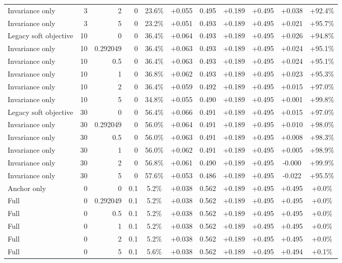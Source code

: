 \begin{table}[htbp]
\begin{tabular}{lrrrccccccc}
Invariance only & 3 & 2 & 0 & 23.6\% & +0.055 & 0.495 & +0.189 & +0.495 & +0.038 & +92.4\% \\
Invariance only & 3 & 5 & 0 & 23.2\% & +0.051 & 0.493 & +0.189 & +0.495 & +0.021 & +95.7\% \\
Legacy soft objective & 10 & 0 & 0 & 36.4\% & +0.064 & 0.493 & +0.189 & +0.495 & +0.026 & +94.8\% \\
Invariance only & 10 & 0.292049 & 0 & 36.4\% & +0.063 & 0.493 & +0.189 & +0.495 & +0.024 & +95.1\% \\
Invariance only & 10 & 0.5 & 0 & 36.4\% & +0.063 & 0.493 & +0.189 & +0.495 & +0.024 & +95.1\% \\
Invariance only & 10 & 1 & 0 & 36.8\% & +0.062 & 0.493 & +0.189 & +0.495 & +0.023 & +95.3\% \\
Invariance only & 10 & 2 & 0 & 36.4\% & +0.059 & 0.492 & +0.189 & +0.495 & +0.015 & +97.0\% \\
Invariance only & 10 & 5 & 0 & 34.8\% & +0.055 & 0.490 & +0.189 & +0.495 & +0.001 & +99.8\% \\
Legacy soft objective & 30 & 0 & 0 & 56.4\% & +0.066 & 0.491 & +0.189 & +0.495 & +0.015 & +97.0\% \\
Invariance only & 30 & 0.292049 & 0 & 56.0\% & +0.064 & 0.491 & +0.189 & +0.495 & +0.010 & +98.0\% \\
Invariance only & 30 & 0.5 & 0 & 56.0\% & +0.063 & 0.491 & +0.189 & +0.495 & +0.008 & +98.3\% \\
Invariance only & 30 & 1 & 0 & 56.0\% & +0.062 & 0.491 & +0.189 & +0.495 & +0.005 & +98.9\% \\
Invariance only & 30 & 2 & 0 & 56.8\% & +0.061 & 0.490 & +0.189 & +0.495 & -0.000 & +99.9\% \\
Invariance only & 30 & 5 & 0 & 57.6\% & +0.053 & 0.486 & +0.189 & +0.495 & -0.022 & +95.5\% \\
Anchor only & 0 & 0 & 0.1 & 5.2\% & +0.038 & 0.562 & +0.189 & +0.495 & +0.495 & +0.0\% \\
Full & 0 & 0.292049 & 0.1 & 5.2\% & +0.038 & 0.562 & +0.189 & +0.495 & +0.495 & +0.0\% \\
Full & 0 & 0.5 & 0.1 & 5.2\% & +0.038 & 0.562 & +0.189 & +0.495 & +0.495 & +0.0\% \\
Full & 0 & 1 & 0.1 & 5.2\% & +0.038 & 0.562 & +0.189 & +0.495 & +0.495 & +0.0\% \\
Full & 0 & 2 & 0.1 & 5.2\% & +0.038 & 0.562 & +0.189 & +0.495 & +0.495 & +0.0\% \\
Full & 0 & 5 & 0.1 & 5.6\% & +0.038 & 0.562 & +0.189 & +0.495 & +0.494 & +0.1\% \\

\end{tabular}
\end{table}
